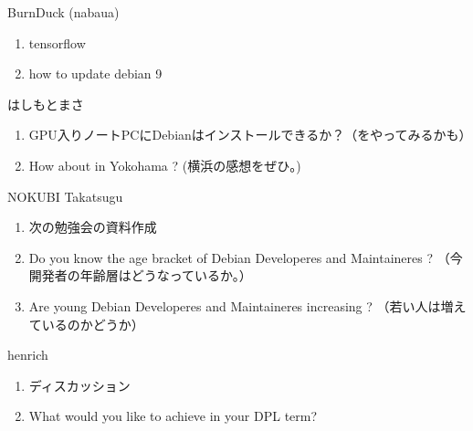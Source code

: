 \begin{prework}{ BurnDuck (nabaua) }
  \begin{enumerate}
  \item tensorflow
  \item how to update debian 9
  \end{enumerate}
\end{prework}

\begin{prework}{ はしもとまさ }
  \begin{enumerate}
  \item GPU入りノートPCにDebianはインストールできるか？（をやってみるかも）
  \item How about in Yokohama ? (横浜の感想をぜひ。)
  \end{enumerate}
\end{prework}

\begin{prework}{ NOKUBI Takatsugu }
  \begin{enumerate}
  \item 次の勉強会の資料作成
  \item Do you know the age bracket of Debian Developeres and Maintaineres ? （今開発者の年齢層はどうなっているか。）
  \item Are young Debian Developeres and Maintaineres increasing ? （若い人は増えているのかどうか）
  \end{enumerate}
\end{prework}

\begin{prework}{ henrich }
  \begin{enumerate}
  \item ディスカッション
  \item What would you like to achieve in your DPL term?
  \end{enumerate}
\end{prework}
